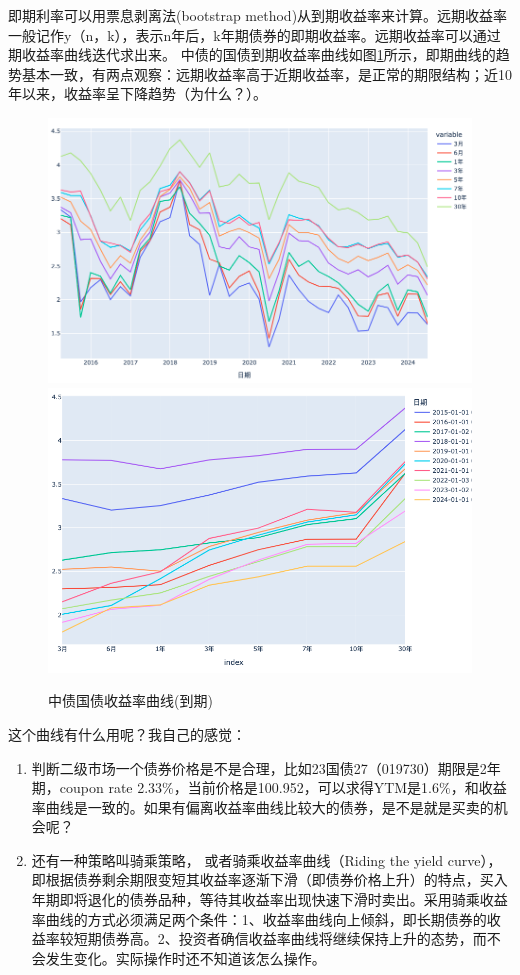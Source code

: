 \documentclass[11pt,oneside,a4paper,notitlepage]{article}
\begin{document}
\begin{CJK}{UTF8}{gbsn}
即期利率可以用票息剥离法(bootstrap method)从到期收益率来计算。远期收益率一般记作y（n，k），表示n年后，k年期债券的即期收益率。远期收益率可以通过期收益率曲线迭代求出来。
中债的国债到期收益率曲线如图\ref{fig:bond_curve}所示，即期曲线的趋势基本一致，有两点观察：远期收益率高于近期收益率，是正常的期限结构；近10年以来，收益率呈下降趋势（为什么？）。
\begin{figure}
  \centering
  \includegraphics[scale=0.4]{figures/ir_t.png}
  \includegraphics[scale=0.4]{figures/ir_mat.png}
  \caption{中债国债收益率曲线(到期)}
  \label{fig:bond_curve}
\end{figure}


这个曲线有什么用呢？我自己的感觉：
\begin{enumerate}
\item  判断二级市场一个债券价格是不是合理，比如23国债27（019730）期限是2年期，coupon rate 2.33\%，当前价格是100.952，可以求得YTM是1.6\%，和收益率曲线是一致的。如果有偏离收益率曲线比较大的债券，是不是就是买卖的机会呢？
\item 还有一种策略叫骑乘策略， 或者骑乘收益率曲线（Riding the yield curve），即根据债券剩余期限变短其收益率逐渐下滑（即债券价格上升）的特点，买入年期即将退化的债券品种，等待其收益率出现快速下滑时卖出。采用骑乘收益率曲线的方式必须满足两个条件：1、收益率曲线向上倾斜，即长期债券的收益率较短期债券高。2、投资者确信收益率曲线将继续保持上升的态势，而不会发生变化。实际操作时还不知道该怎么操作。
\end{enumerate}


\end{CJK}
\end{document}
